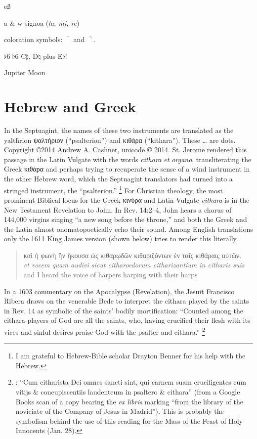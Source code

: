 \documentclass[12pt]{article}
\newcommand{\fl}{$\flat$}
\newcommand{\sh}{$\sharp$}
\newcommand{\na}{$\natural$}
\newcommand{\undertie}{\textbottomtiebar{\hphantom{m}}}
\begin{document}
eß

\textgreek{a} \& \textgreek{w} signo\undertie a (\emph{la, mi, re})

coloration symbols: $\ulcorner$ and $\urcorner$.

\fl6 \fl 6 C\sh, D\na{} plus E\fl{}!

Jupiter \jupiter Moon \leftmoon \rightmoon

\section{%
Hebrew and Greek
}

In the Septuagint, the names of these two instruments are translated as the \textgreek{yalt\'hrion} \textgreek{ψαλτήριον} (``psalterion'') and \textgreek{κιθάρα} (``kithara'').
These \dots{} are dots.
Copyright \copyright 2014 Andrew A. Cashner, unicode © 2014.
St. Jerome rendered this passage in the Latin Vulgate with the words \emph{cithara et organo}, transliterating the Greek \textgreek{κιθάρα} and perhaps trying to recuperate the sense of a wind instrument in the other Hebrew word, which the Septuagint translators had turned into a stringed instrument, the ``psalterion.''
\footnote{%
I am grateful to Hebrew-Bible scholar Drayton Benner for his help with the Hebrew. 
}
%
For Christian theology, the most prominent Biblical locus for the Greek \textgreek{κινύρα} and Latin Vulgate \emph{cithara} is in the New Testament Revelation to John.
In Rev. 14:2--4, John hears a chorus of 144,000 virgins singing ``a new song before the throne,'' and both the Greek and the Latin almost onomatopoetically echo their sound.
Among English translations only the 1611 King James version (shown below) tries to render this literally.

\begin{quote}
%
\textgreek{καὶ ἡ φωνὴ ἣν ἤκουσα ὡς κιθαρῳδῶν κιθαριζόντων ἐν ταῖς κιθάραις αὐτῶν.}\\
%
\emph{et vocem quam audivi sicut citharoedorum citharizantium in citharis suis}\\
%
and I heard the voice of harpers harping with their harps
%
\end{quote}

In a 1603 commentary on the Apocalypse (Revelation), the Jesuit Francisco Ribera draws on the venerable Bede to interpret the cithara played by the saints in Rev. 14 as symbolic of the saints' bodily mortification: 
``Counted among the cithara-players of God are all the saints, who, having crucified their flesh with its vices and sinful desires praise God with the psalter and cithara.''%
	\footnote{
	\autocite[429]{Ribera:Apocalypse}: ``Cum citharista Dei omnes sancti sint, qui carnem suam crucifigentes cum vitijs \& concupiscentiis laudenteum in psaltero \& cithara'' (from a Google Books scan of a copy bearing the \emph{ex libris} marking ``from the library of the noviciate of the Company of Jesus in Madrid'').
This is probably the symbolism behind the use of this reading for the Mass of the Feast of Holy Innocents (Jan. 28).
	} 
\end{document}

